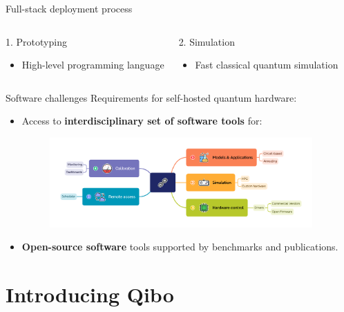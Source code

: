 \documentclass[aspectratio=169, 10pt, xcolor={svgnames}, hyperref={linkcolor=black}]{beamer}
\begin{document}
\begin{frame}{Full-stack deployment process}
\begin{columns}
\begin{block}{1. Prototyping}
     \begin{itemize}
       \item High-level programming language
     \end{itemize}
     \end{block}
     \begin{exampleblock}{2. Simulation}
       \begin{itemize}
         \item Fast classical quantum simulation
       \end{itemize}
   \end{exampleblock}
   \end{columns}
 \end{frame}

\begin{frame}{Software challenges}
   Requirements for self-hosted quantum hardware:
   \begin{itemize}
   \item[1.] Access to {\color{violet} \bf interdisciplinary set of software tools} for:
   \begin{figure}
     \includegraphics[width=0.95\textwidth]{figures/challenges.pdf}
   \end{figure}
     \item[2.] {\bf \color{teal} Open-source software} tools supported by benchmarks and publications.
   \end{itemize}
 \end{frame}

\section{Introducing Qibo}
\end{document}
